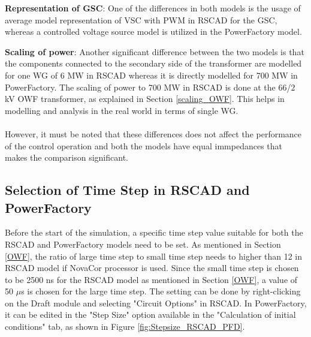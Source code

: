 \textbf{Representation of \gls{GSC}}: One of the differences in both models is the usage of average model representation of \gls{VSC} with \gls{PWM} in RSCAD for the \gls{GSC}, whereas a controlled voltage source model is utilized in the PowerFactory model.
\vspace{3mm}

\textbf{Scaling of power}: Another significant difference between the two models is that the components connected to the secondary side of the transformer are modelled for one \gls{WG} of 6 MW in RSCAD whereas it is directly modelled for 700 MW in PowerFactory. The scaling of power to 700 MW in RSCAD is done at the 66/2 kV \gls{OWF} transformer, as explained in Section \ref{scaling_OWF}. This helps in modelling and analysis in the real world in terms of single \gls{WG}.
\vspace{-3mm}
\paragraph{}
However, it must be noted that these differences does not affect the performance of the control operation and both the models have equal immpedances that makes the comparison significant. 

\subsection{Selection of Time Step in RSCAD and PowerFactory}
Before the start of the simulation, a specific time step value suitable for both the RSCAD and PowerFactory models need to be set. As mentioned in Section \ref{OWF}, the ratio of large time step to small time step needs to higher than 12 in RSCAD model if NovaCor processor is used. Since the small time step is chosen to be 2500 ns for the RSCAD model as mentioned in Section \ref{OWF}, a value of 50 $\mu$s is chosen for the large time step. The setting can be done by right-clicking on the Draft module and selecting "Circuit Options" in RSCAD. In PowerFactory, it can be edited in the "Step Size" option available in the "Calculation of initial conditions" tab, as shown in Figure \ref{fig:Stepsize_RSCAD_PFD}.  


